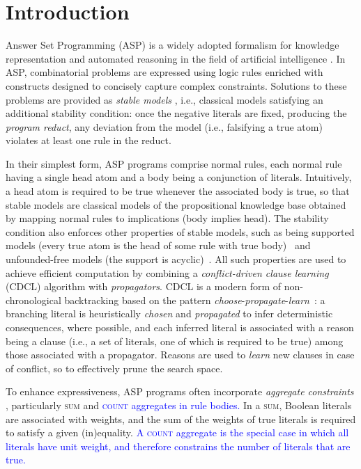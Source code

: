 \documentclass[preprint,authoryear]{elsarticle}
\theoremstyle{definition}
\begin{document}

\section{Introduction}

Answer Set Programming (ASP) is a widely adopted formalism for knowledge representation and automated reasoning in the field of artificial intelligence \citep{MarekT99,Niemela99}.
In ASP, combinatorial problems are expressed using logic rules enriched with constructs designed to concisely capture complex constraints.
Solutions to these problems are provided as \emph{stable models} \citep{GelfondL90}, i.e., classical models satisfying an additional stability condition:
once the negative literals are fixed, producing the \emph{program reduct}, any deviation from the model (i.e., falsifying a true atom) violates at least one rule in the reduct.

In their simplest form, ASP programs comprise normal rules, each normal rule having a single head atom and a body being a conjunction of literals.
Intuitively, a head atom is required to be true whenever the associated body is true, so that stable models are classical models of the propositional knowledge base obtained by mapping normal rules to implications (body implies head).
The stability condition also enforces other properties of stable models, such as being supported models (every true atom is the head of some rule with true body)~\citep{DBLP:journals/mlcs/Fages94} and unfounded-free models (the support is acyclic)~\citep{DBLP:journals/tcs/Dung92}.
All such properties are used to achieve efficient computation by combining a \emph{conflict-driven clause learning} (CDCL) algorithm \citep{DBLP:journals/ia/Dodaro24} with \emph{propagators}.
CDCL is a modern form of non-chronological backtracking based on the pattern \textit{choose}-\textit{propagate}-\textit{learn}~\citep{DBLP:series/faia/0001LM21}:
a branching literal is heuristically \textit{chosen} and \emph{propagated} to infer deterministic consequences, where possible, and each inferred literal is associated with a reason being a clause (i.e., a set of literals, one of which is required to be true) among those associated with a propagator.
Reasons are used to \emph{learn} new clauses in case of conflict, so to effectively prune the search space.

To enhance expressiveness, ASP programs often incorporate \emph{aggregate constraints} \citep{DBLP:conf/aaaiss/BartholomewLM11,DBLP:journals/ai/FaberPL11,DBLP:journals/tocl/Ferraris11,DBLP:journals/tplp/GelfondZ14,DBLP:journals/ai/LiuPST10,DBLP:journals/ai/SimonsNS02}, particularly \textsc{sum} and \textcolor{blue}{\textsc{count} aggregates in rule bodies.}
In a \textsc{sum}, Boolean literals are associated with weights, and the sum of the weights of true literals is required to satisfy a given (in)equality.
\textcolor{blue}{A \textsc{count} aggregate is the special case in which all literals have unit weight, and therefore constrains the number of literals that are true.}
\end{document}
